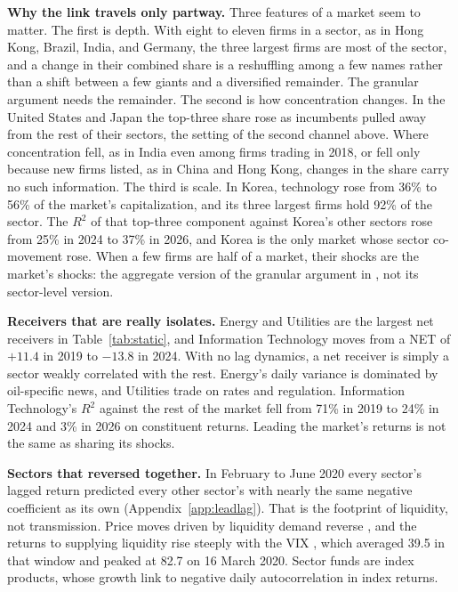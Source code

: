 \documentclass[11pt]{article}
\begin{document}
\textbf{Why the link travels only partway.} Three features of a market seem to matter. The first is depth. With eight to eleven firms in a sector, as in Hong Kong, Brazil, India, and Germany, the three largest firms are most of the sector, and a change in their combined share is a reshuffling among a few names rather than a shift between a few giants and a diversified remainder. The granular argument needs the remainder. The second is how concentration changes. In the United States and Japan the top-three share rose as incumbents pulled away from the rest of their sectors, the setting of the second channel above. Where concentration fell, as in India even among firms trading in 2018, or fell only because new firms listed, as in China and Hong Kong, changes in the share carry no such information. The third is scale. In Korea, technology rose from 36\% to 56\% of the market's capitalization, and its three largest firms hold 92\% of the sector. The $R^2$ of that top-three component against Korea's other sectors rose from 25\% in 2024 to 37\% in 2026, and Korea is the only market whose sector co-movement rose. When a few firms are half of a market, their shocks are the market's shocks: the aggregate version of the granular argument in \citet{gabaix2011}, not its sector-level version.

\textbf{Receivers that are really isolates.} Energy and Utilities are the largest net receivers in Table~\ref{tab:static}, and Information Technology moves from a NET of $+11.4$ in 2019 to $-13.8$ in 2024. With no lag dynamics, a net receiver is simply a sector weakly correlated with the rest. Energy's daily variance is dominated by oil-specific news, and Utilities trade on rates and regulation. Information Technology's $R^2$ against the rest of the market fell from 71\% in 2019 to 24\% in 2024 and 3\% in 2026 on constituent returns. Leading the market's returns is not the same as sharing its shocks.

\textbf{Sectors that reversed together.} In February to June 2020 every sector's lagged return predicted every other sector's with nearly the same negative coefficient as its own (Appendix~\ref{app:leadlag}). That is the footprint of liquidity, not transmission. Price moves driven by liquidity demand reverse \citep{campbell1993}, and the returns to supplying liquidity rise steeply with the VIX \citep{nagel2012}, which averaged 39.5 in that window and peaked at 82.7 on 16 March 2020. Sector funds are index products, whose growth \citet{baltussen2019} link to negative daily autocorrelation in index returns.
\end{document}
